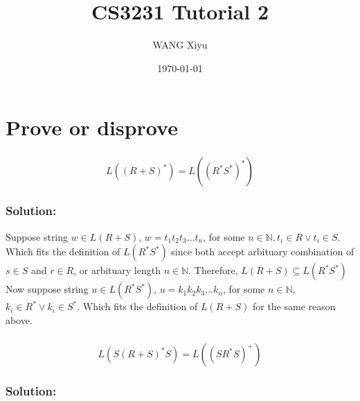 \documentclass[12pt]{article}
\title{CS3231 Tutorial 2}
\author{WANG Xiyu}
\date{\today}
\begin{document}
\maketitle

\tableofcontents 

\section{}

\section*{Prove or disprove}
\subsubsection*{}
\[L((R + S)^*) = L((R^*S^*)^*)\]
\subsubsection*{Solution:}
Suppose string $w \in L(R+S)$, $w = t_1t_2t_3...t_n$, for some $n \in \mathbb{N}, t_i \in R \lor t_i \in S$.
Which fits the definition of $L(R^*S^*)$ since both accept arbituary combination of $s \in S$ and $r \in R$, or arbituary length $n \in \mathbb{N}$.
\newline
Therefore, $L(R+S) \subseteq L(R^*S^*)$ 
\newline
\newline
Now suppose string $u \in L(R^*S^*)$, $u = k_1k_2k_3...k_n$, for some $n \in \mathbb{N}$, $k_i \in R^* \lor k_i \in S^*$.
Which fits the definition of $L(R+S)$ for the same reason above.



\subsubsection*{}
\[L(S(R+S)^*S) = L((SR^*S)^+)\]
\subsubsection*{Solution:}
 
\end{document}
